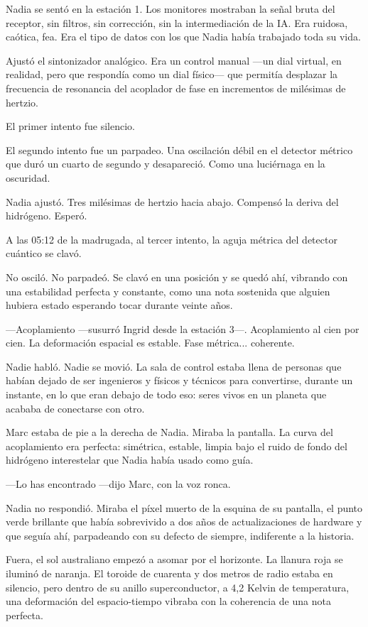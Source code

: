 \documentclass[11pt,a5paper,twoside]{book}
\begin{document}
Nadia se sentó en la estación 1. Los monitores mostraban la señal bruta del receptor, sin filtros, sin corrección, sin la intermediación de la IA. Era ruidosa, caótica, fea. Era el tipo de datos con los que Nadia había trabajado toda su vida.

Ajustó el sintonizador analógico. Era un control manual —un dial virtual, en realidad, pero que respondía como un dial físico— que permitía desplazar la frecuencia de resonancia del acoplador de fase en incrementos de milésimas de hertzio.

El primer intento fue silencio.

El segundo intento fue un parpadeo. Una oscilación débil en el detector métrico que duró un cuarto de segundo y desapareció. Como una luciérnaga en la oscuridad.

Nadia ajustó. Tres milésimas de hertzio hacia abajo. Compensó la deriva del hidrógeno. Esperó.

A las 05:12 de la madrugada, al tercer intento, la aguja métrica del detector cuántico se clavó.

No osciló. No parpadeó. Se clavó en una posición y se quedó ahí, vibrando con una estabilidad perfecta y constante, como una nota sostenida que alguien hubiera estado esperando tocar durante veinte años.

—Acoplamiento —susurró Ingrid desde la estación 3—. Acoplamiento al cien por cien. La deformación espacial es estable. Fase métrica... coherente.

Nadie habló. Nadie se movió. La sala de control estaba llena de personas que habían dejado de ser ingenieros y físicos y técnicos para convertirse, durante un instante, en lo que eran debajo de todo eso: seres vivos en un planeta que acababa de conectarse con otro.

Marc estaba de pie a la derecha de Nadia. Miraba la pantalla. La curva del acoplamiento era perfecta: simétrica, estable, limpia bajo el ruido de fondo del hidrógeno interestelar que Nadia había usado como guía.

—Lo has encontrado —dijo Marc, con la voz ronca.

Nadia no respondió. Miraba el píxel muerto de la esquina de su pantalla, el punto verde brillante que había sobrevivido a dos años de actualizaciones de hardware y que seguía ahí, parpadeando con su defecto de siempre, indiferente a la historia.

Fuera, el sol australiano empezó a asomar por el horizonte. La llanura roja se iluminó de naranja. El toroide de cuarenta y dos metros de radio estaba en silencio, pero dentro de su anillo superconductor, a 4,2 Kelvin de temperatura, una deformación del espacio-tiempo vibraba con la coherencia de una nota perfecta.
\end{document}
